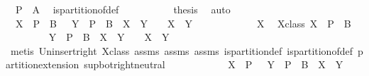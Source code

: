\begin{isabellebody}
\ {\isachardoublequoteopen}{\isasymUnion}\ P\ {\isacharequal}\ A{\isachardoublequoteclose}\ \isamarkupfalse%
\ is{\isacharunderscore}partition{\isacharunderscore}of{\isacharunderscore}def\ \isacommand{{\isachardot}{\isachardot}}\isamarkupfalse%
\isanewline
\ \ \ \ \ \ \isamarkupfalse%
\ \isamarkupfalse%
\ {\isacharquery}thesis\ \isamarkupfalse%
\ auto\isanewline
\ \ \ \ \isamarkupfalse%
\isanewline
\ \ \ \ \isamarkupfalse%
\ {\isachardoublequoteopen}{\isasymforall}\ X\ {\isasymin}\ P\ {\isasymunion}\ {\isacharbraceleft}B{\isacharbraceright}\ {\isachardot}\ {\isasymforall}\ Y\ {\isasymin}\ P\ {\isasymunion}\ {\isacharbraceleft}B{\isacharbraceright}\ {\isachardot}\ {\isacharparenleft}X\ {\isasyminter}\ Y\ {\isasymnoteq}\ {\isacharbraceleft}{\isacharbraceright}\ {\isasymlongleftrightarrow}\ X\ {\isacharequal}\ Y{\isacharparenright}{\isachardoublequoteclose}\isanewline
\ \ \ \ \isamarkupfalse%
\isanewline
\ \ \ \ \ \ \isamarkupfalse%
\ X\ \isamarkupfalse%
\ X{\isacharunderscore}class{\isacharcolon}\ {\isachardoublequoteopen}X\ {\isasymin}\ P\ {\isasymunion}\ {\isacharbraceleft}B{\isacharbraceright}{\isachardoublequoteclose}\isanewline
\ \ \ \ \ \ \isamarkupfalse%
\ {\isachardoublequoteopen}{\isasymforall}\ Y\ {\isasymin}\ P\ {\isasymunion}\ {\isacharbraceleft}B{\isacharbraceright}\ {\isachardot}\ {\isacharparenleft}X\ {\isasyminter}\ Y\ {\isasymnoteq}\ {\isacharbraceleft}{\isacharbraceright}\ {\isasymlongleftrightarrow}\ X\ {\isacharequal}\ Y{\isacharparenright}{\isachardoublequoteclose}\ \isanewline
{}\isamarkupfalse%
\ {\isacharparenleft}metis\ Un{\isacharunderscore}insert{\isacharunderscore}right\ X{\isacharunderscore}class\ assms{\isacharparenleft}{}{\isacharparenright}\ assms{\isacharparenleft}{}{\isacharparenright}\ assms{\isacharparenleft}{}{\isacharparenright}\ is{\isacharunderscore}partition{\isacharunderscore}def\ is{\isacharunderscore}partition{\isacharunderscore}of{\isacharunderscore}def\ partition{\isacharunderscore}extension{}\ sup{\isacharunderscore}bot{\isachardot}right{\isacharunderscore}neutral{\isacharparenright}\isanewline
\isanewline
\ \ \ \ \isamarkupfalse%
\isanewline
\ \ \isamarkupfalse%
\isanewline
\ \ \isamarkupfalse%
\ {\isachardoublequoteopen}{\isasymforall}\ X\ {\isasymin}\ P\ {\isachardot}\ {\isasymexists}\ Y\ {\isasymin}\ P\ {\isasymunion}\ {\isacharbraceleft}B{\isacharbraceright}\ {\isachardot}\ X\ {\isasymsubseteq}\ Y{\isachardoublequoteclose}\isanewline

\end{isabellebody}
